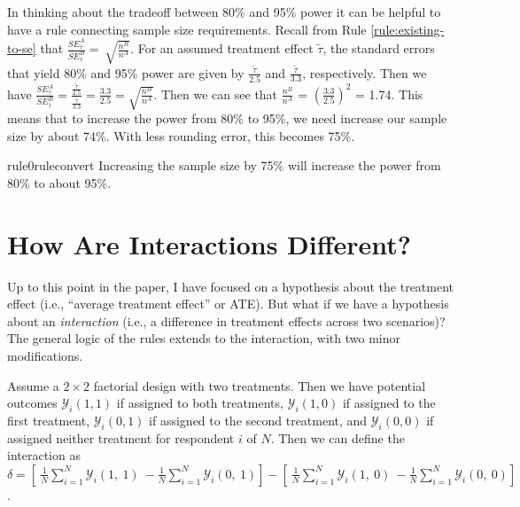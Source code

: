 \documentclass[12pt]{article}
\begin{document}
In thinking about the tradeoff between 80\% and 95\% power it can be helpful to have a rule connecting sample size requirements. 
Recall from
Rule \ref{rule:existing-to-se} that $\frac{SE_{\widehat{\tau}}^{A}}{SE_{\widehat{\tau}}^{B}} = \ \sqrt{\frac{n^{B}}{n^{A}}}$.
For an assumed treatment effect $\widetilde{\tau}$, the standard errors that yield 80\% and 95\% power are given by $\frac{\widetilde{\tau}}{2.5}$
and $\frac{\widetilde{\tau}}{3.3}$, respectively. 
Then we have $\frac{SE_{\widehat{\tau}}^{A}}{SE_{\widehat{\tau}}^{B}} = \frac{\frac{\widetilde{\tau}}{2.5}}{\frac{\widetilde{\tau}}{3.3}} = \frac{3.3}{2.5} = \sqrt{\frac{n^{B}}{n^{A}}}$.
Then we can see that $\frac{n^{B}}{n^{A}}$ = $\left( \frac{3.3}{2.5} \right)^{2}$ = 1.74. This means that to increase the power from 80\% to 95\%, we need increase our sample size by about 74\%. 
With less rounding error, this becomes 75\%.

\begin{restatable}[80\% to 95\% Power]{rule0}{ruleconvert}
\label{rule:80-to-95}
Increasing the sample size by 75\% will increase the power from 80\% to about 95\%.
\end{restatable}

\section*{How Are Interactions Different?}

Up to this point in the paper, I have focused on a hypothesis about the treatment effect (i.e., ``average treatment effect'' or ATE). 
But what if we have a hypothesis about an \emph{interaction} (i.e., a difference in treatment effects across two scenarios)? 
The general logic of the rules extends to the interaction, with two minor modifications.

Assume a $2 \times 2$ factorial design with two treatments. 
Then we have potential outcomes $\mathcal{Y}_{i}(1, 1)$ if assigned to both treatments, $\mathcal{Y}_{i}(1,0)$ if assigned to the first treatment, $\mathcal{Y}_{i}(0,1)$ if assigned to the second treatment, and $\mathcal{Y}_{i}(0,0)$ if assigned neither treatment for respondent $i$ of $N$. 
Then we can define the interaction as $\delta = \left\lbrack \ \frac{1}{N}\sum_{i = 1}^{N}{\mathcal{Y}_{i}(1,\ 1)\ } - \frac{1}{N}\sum_{i = 1}^{N}{\mathcal{Y}_{i}(0,\ 1)} \right\rbrack - \left\lbrack \ \frac{1}{N}\sum_{i = 1}^{N}{\mathcal{Y}_{i}(1,\ 0)\ }- \frac{1}{N}\sum_{i = 1}^{N}{\mathcal{Y}_{i}(0,\ 0)} \right\rbrack$.
\end{document}
